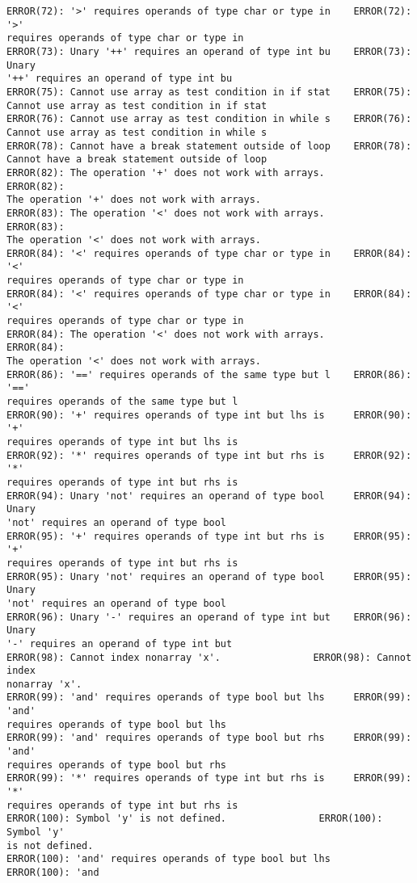 \documentclass[12pt]{book}
\begin{document}
\begin{lstlisting}
ERROR(72): '>' requires operands of type char or type in    ERROR(72): '>' 
requires operands of type char or type in
ERROR(73): Unary '++' requires an operand of type int bu    ERROR(73): Unary
'++' requires an operand of type int bu
ERROR(75): Cannot use array as test condition in if stat    ERROR(75): 
Cannot use array as test condition in if stat
ERROR(76): Cannot use array as test condition in while s    ERROR(76): 
Cannot use array as test condition in while s
ERROR(78): Cannot have a break statement outside of loop    ERROR(78): 
Cannot have a break statement outside of loop
ERROR(82): The operation '+' does not work with arrays.        ERROR(82): 
The operation '+' does not work with arrays.
ERROR(83): The operation '<' does not work with arrays.        ERROR(83): 
The operation '<' does not work with arrays.
ERROR(84): '<' requires operands of type char or type in    ERROR(84): '<' 
requires operands of type char or type in
ERROR(84): '<' requires operands of type char or type in    ERROR(84): '<' 
requires operands of type char or type in
ERROR(84): The operation '<' does not work with arrays.        ERROR(84): 
The operation '<' does not work with arrays.
ERROR(86): '==' requires operands of the same type but l    ERROR(86): '==' 
requires operands of the same type but l
ERROR(90): '+' requires operands of type int but lhs is     ERROR(90): '+' 
requires operands of type int but lhs is 
ERROR(92): '*' requires operands of type int but rhs is     ERROR(92): '*' 
requires operands of type int but rhs is 
ERROR(94): Unary 'not' requires an operand of type bool     ERROR(94): Unary
'not' requires an operand of type bool 
ERROR(95): '+' requires operands of type int but rhs is     ERROR(95): '+' 
requires operands of type int but rhs is 
ERROR(95): Unary 'not' requires an operand of type bool     ERROR(95): Unary
'not' requires an operand of type bool 
ERROR(96): Unary '-' requires an operand of type int but    ERROR(96): Unary
'-' requires an operand of type int but
ERROR(98): Cannot index nonarray 'x'.                ERROR(98): Cannot index
nonarray 'x'.
ERROR(99): 'and' requires operands of type bool but lhs     ERROR(99): 'and'
requires operands of type bool but lhs 
ERROR(99): 'and' requires operands of type bool but rhs     ERROR(99): 'and'
requires operands of type bool but rhs 
ERROR(99): '*' requires operands of type int but rhs is     ERROR(99): '*' 
requires operands of type int but rhs is 
ERROR(100): Symbol 'y' is not defined.                ERROR(100): Symbol 'y'
is not defined.
ERROR(100): 'and' requires operands of type bool but lhs    ERROR(100): 'and

\end{lstlisting}
\end{document}
